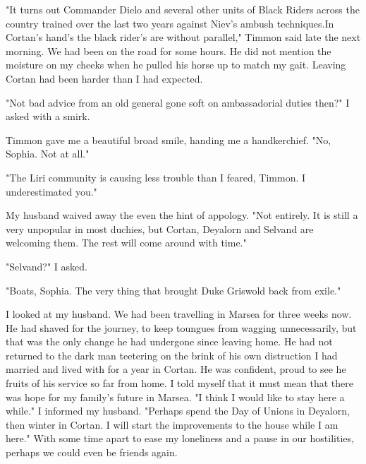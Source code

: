 \documentclass{article}
\begin{document}
"It turns out Commander Dielo and several other units of Black Riders across the country trained over the last two years against Niev's ambush techniques.In Cortan's hand's the black rider's are without parallel," Timmon said late the next morning. We had been on the road for some hours. He did not mention the moisture on my cheeks when he pulled his horse up to match my gait. Leaving Cortan had been harder than I had expected.

"Not bad advice from an old general gone soft on ambassadorial duties then?" I asked with a smirk.

Timmon gave me a beautiful broad smile, handing me a handkerchief. "No, Sophia. Not at all." 

"The Liri community is causing less trouble than I feared, Timmon. I underestimated you." 
 
My husband waived away the even the hint of appology. "Not entirely. It is still a very unpopular in most duchies, but Cortan, Deyalorn and Selvand are welcoming them. The rest will come around with time."

"Selvand?" I asked.

"Boats, Sophia. The very thing that brought Duke Griswold back from exile."

I looked at my husband. We had been travelling in Marsea for three weeks now. He had shaved for the journey, to keep toungues from wagging unnecessarily, but that was the only change he had undergone since leaving home. He had not returned to the dark man teetering on the brink of his own distruction I had married and lived with for a year in Cortan. He was confident, proud to see he fruits of his service so far from home. I told myself that it must mean that there was hope for my family's future in Marsea. "I think I would like to stay here a while." I informed my husband. "Perhaps spend the Day of Unions in Deyalorn, then winter in Cortan. I will start the improvements to the house while I am here." With some time apart to ease my loneliness and a pause in our hostilities, perhaps we could even be friends again.

\vpsace{.5cm}
\end{document}
